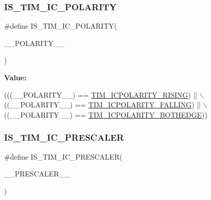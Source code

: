 \subsubsection{\texorpdfstring{I\+S\+\_\+\+T\+I\+M\+\_\+\+I\+C\+\_\+\+P\+O\+L\+A\+R\+I\+TY}{IS\_TIM\_IC\_POLARITY}}
{\footnotesize\ttfamily \#define I\+S\+\_\+\+T\+I\+M\+\_\+\+I\+C\+\_\+\+P\+O\+L\+A\+R\+I\+TY(\begin{DoxyParamCaption}\item[{}]{\+\_\+\+\_\+\+P\+O\+L\+A\+R\+I\+T\+Y\+\_\+\+\_\+ }\end{DoxyParamCaption})}

{\bfseries Value\+:}
\begin{DoxyCode}
(((\_\_POLARITY\_\_) == \hyperlink{group___t_i_m___input___capture___polarity_gac79dd2a7ba97e5aac0bb9cbdc2d02ee1}{TIM\_ICPOLARITY\_RISING})   || \(\backslash\)
                                            ((\_\_POLARITY\_\_) == 
      \hyperlink{group___t_i_m___input___capture___polarity_gaec0c00d0b749e8c18101cefcce7c32f6}{TIM\_ICPOLARITY\_FALLING})  || \(\backslash\)
                                            ((\_\_POLARITY\_\_) == 
      \hyperlink{group___t_i_m___input___capture___polarity_ga7a340c94a7bd0fa4a915afa8788e0b71}{TIM\_ICPOLARITY\_BOTHEDGE}))
\end{DoxyCode}
\mbox{\label{group___t_i_m___private___macros_ga86558ff4924a0526ce7593db238a17ab}} 
\subsubsection{\texorpdfstring{I\+S\+\_\+\+T\+I\+M\+\_\+\+I\+C\+\_\+\+P\+R\+E\+S\+C\+A\+L\+ER}{IS\_TIM\_IC\_PRESCALER}}
{\footnotesize\ttfamily \#define I\+S\+\_\+\+T\+I\+M\+\_\+\+I\+C\+\_\+\+P\+R\+E\+S\+C\+A\+L\+ER(\begin{DoxyParamCaption}\item[{}]{\+\_\+\+\_\+\+P\+R\+E\+S\+C\+A\+L\+E\+R\+\_\+\+\_\+ }\end{DoxyParamCaption})}

